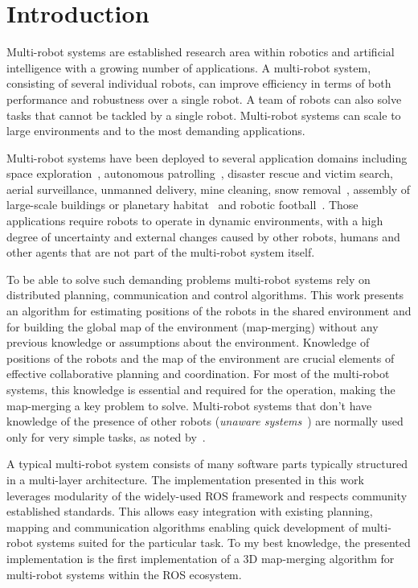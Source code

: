 \chapter*{Introduction}

Multi-robot systems are established research area within robotics and artificial intelligence with a growing number of applications. A multi-robot system, consisting of several individual robots, can improve efficiency in terms of both performance and robustness over a single robot. A team of robots can also solve tasks that cannot be tackled by a single robot. Multi-robot systems can scale to large environments and to the most demanding applications.

Multi-robot systems have been deployed to several application domains including space exploration~\citep{goldberg2002distributedspace,huntsberger2003campout}, autonomous patrolling~\citep{parker2003parolling100}, disaster rescue and victim search, aerial surveillance, unmanned delivery, mine cleaning, snow removal~\citep{choset2001coverage}, assembly of large-scale buildings or planetary habitat~\citep{goldberg2002distributedspace} and robotic football~\citep{asada1999robocup}. Those applications require robots to operate in dynamic environments, with a high degree of uncertainty and external changes caused by other robots, humans and other agents that are not part of the multi-robot system itself.

To be able to solve such demanding problems multi-robot systems rely on distributed planning, communication and control algorithms. This work presents an algorithm for estimating positions of the robots in the shared environment and for building the global map of the environment (map-merging) without any previous knowledge or assumptions about the environment. Knowledge of positions of the robots and the map of the environment are crucial elements of effective collaborative planning and coordination. For most of the multi-robot systems, this knowledge is essential and required for the operation, making the map-merging a key problem to solve. Multi-robot systems that don't have knowledge of the presence of other robots (\textit{unaware systems}~\citep{farinelli2004multirobot}) are normally used only for very simple tasks, as noted by~\citet{farinelli2004multirobot}.

A typical multi-robot system consists of many software parts typically structured in a multi-layer architecture. The implementation presented in this work leverages modularity of the widely-used \gls{ROS} framework and respects community established standards. This allows easy integration with existing planning, mapping and communication algorithms enabling quick development of multi-robot systems suited for the particular task. To my best knowledge, the presented implementation is the first implementation of a \gls{3D} map-merging algorithm for multi-robot systems within the \gls{ROS} ecosystem.

